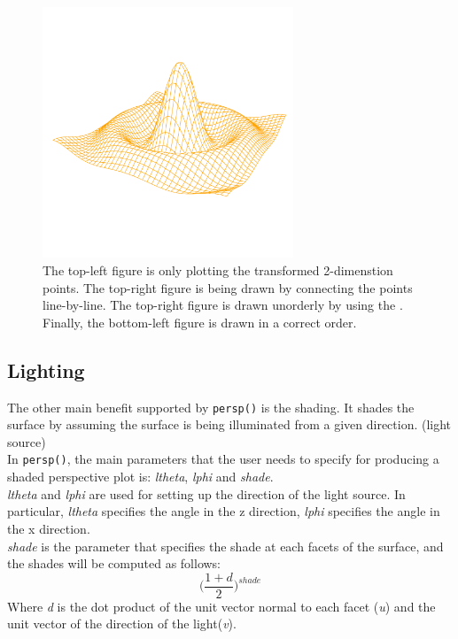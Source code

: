 \documentclass[paper=a4, fontsize=11pt]{report}
\begin{document}
\begin{figure}[h]
\begin{center}
		\includegraphics[height = 7.5cm, width = 7.5cm]{figure/standalone_p_4.pdf}
		\caption{The top-left figure is only plotting the transformed 2-dimenstion points. The top-right figure is being drawn by connecting the points line-by-line. The top-right figure is drawn unorderly by using the . Finally, the bottom-left figure is drawn in a correct order.}
		\label{figure_3.2}
	\end{center}
\end{figure}

\subsection{Lighting}
The other main benefit supported by \texttt{persp()} is the shading. It shades the surface by assuming the surface is being illuminated from a given direction. (light source) \\

In \texttt{persp()}, the main parameters that the user needs to specify for producing a shaded perspective plot is: \textit{ltheta}, \textit{lphi} and \textit{shade}.\\

\textit{ltheta} and \textit{lphi} are used for setting up the direction of the light source. In particular, \textit{ltheta} specifies the angle in the z direction, \textit{lphi} specifies the angle in the x direction. \\

\textit{shade} is the parameter that specifies the shade at each facets of the surface, and the shades will be computed as follows:
\begin{equation}
\big(\frac{1 + d}{2}\big)^{shade}
\end{equation}
Where \textit{d} is the dot product of the unit vector normal to each facet (\textit{u}) and the unit vector of the direction of the light(\textit{v}). \\
\end{document}
